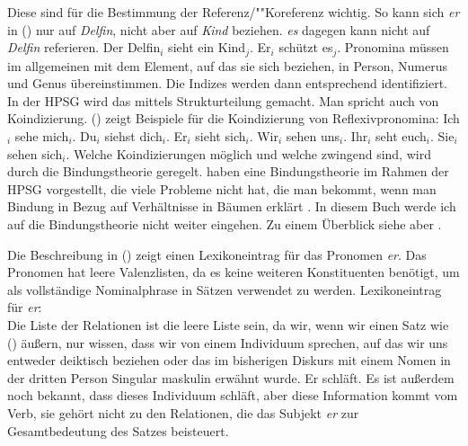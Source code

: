 Diese sind für die Bestimmung der Referenz/""Koreferenz wichtig. So kann
sich \emph{er} in () nur auf \emph{Delfin}, nicht aber auf \emph{Kind}
beziehen. \emph{es} dagegen kann nicht auf \emph{Delfin} referieren.
\ea
Der Delfin$_i$ sieht ein Kind$_j$. Er$_i$ schützt es$_j$.
\z
Pronomina müssen im allgemeinen mit dem Element, auf das sie sich beziehen, in Person,
Numerus und Genus übereinstimmen. Die Indizes werden dann entsprechend identifiziert.
In der HPSG wird das mittels Strukturteilung gemacht. Man spricht auch von Koindizierung.
() zeigt Beispiele für die Koindizierung von Reflexivpronomina:
\eal
\ex Ich$_i$ sehe mich$_i$.
\ex Du$_i$ siehst dich$_i$.
\ex Er$_i$ sieht sich$_i$.
\ex Wir$_i$ sehen uns$_i$.
\ex Ihr$_i$ seht euch$_i$.
\ex Sie$_i$ sehen sich$_i$.
\zl
Welche Koindizierungen möglich und welche zwingend sind, wird durch die Bindungstheorie
geregelt. \citet{PS92a,ps2} haben eine Bindungstheorie im Rahmen der HPSG vorgestellt, die viele Probleme
nicht hat, die man bekommt, wenn man Bindung in Bezug auf Verhältnisse in Bäumen erklärt \citep{Wechsler99a,MS98a}. In diesem Buch werde
ich auf die Bindungstheorie nicht weiter eingehen. Zu einem Überblick siehe aber
.

Die Beschreibung in () zeigt einen Lexikoneintrag für das Pronomen \emph{er}. Das Pronomen
hat leere Valenzlisten, da es keine weiteren Konstituenten benötigt, um als vollständige
Nominalphrase in Sätzen verwendet zu werden.
\eas
\label{le-er}%
Lexikoneintrag für \emph{er}:\\
\zs
Die Liste der Relationen ist die leere Liste sein, da wir, wenn wir einen Satz wie () äußern, nur
wissen, dass wir von einem Individuum sprechen, auf das wir uns entweder deiktisch beziehen oder das
im bisherigen Diskurs mit einem Nomen in der dritten Person Singular maskulin erwähnt wurde.
\ea
Er schläft.
\z
Es ist außerdem noch bekannt, dass dieses Individuum schläft, aber diese Information kommt vom Verb, sie
gehört nicht zu den Relationen, die das Subjekt \emph{er} zur Gesamtbedeutung des Satzes
beisteuert. 

